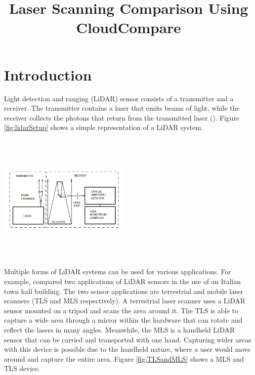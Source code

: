\documentclass[man]{apa7}
\title{Laser Scanning Comparison Using CloudCompare}
\begin{document}
\maketitle
\vspace{-6em}
\section{Introduction\vspace{-5em}}

Light detection and ranging (LiDAR) sensor consists of a transmitter and a receiver. The transmitter contains a laser that emits beams of light, while the receiver collects the photons that return from the transmitted laser (\Textcite{wandinger2005}). Figure \ref{fig:lidarSetup} shows a simple representation of a LiDAR system.

\begin{minipage}{\linewidth}
  \includegraphics[bb=0in 0in 2.5in 2.5in, height=2.5in, width=2.5in]{figures/lidarSetup.png}
  \label{fig:lidarSetup}
\end{minipage}

Multiple forms of LiDAR systems can be used for various applications. For example, \Textcite{conti2024} compared two applications of LiDAR sensors in the use of an Italian town hall building. The two sensor applications are terrestrial and mobile laser scanners (TLS and MLS respectively). A terrestrial laser scanner uses a LiDAR sensor mounted on a tripod and scans the area around it. The TLS is able to capture a wide area through a mirror within the hardware that can rotate and reflect the lasers in many angles. Meanwhile, the MLS is a handheld LiDAR sensor that can be carried and transported with one hand. Capturing wider areas with this device is possible due to the handheld nature, where a user would move around and capture the entire area. Figure \ref{fig:TLSandMLS} shows a MLS and TLS device.
\end{document}
